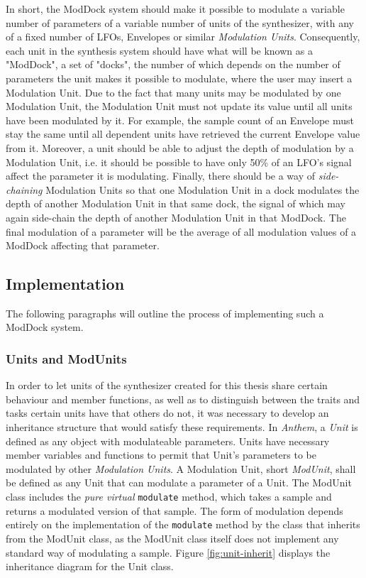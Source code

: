 \documentclass[12pt,twoside]{report}
\begin{document}
In short, the ModDock system should make it possible to modulate a variable number of parameters of a variable number of units of the synthesizer, with any of a fixed number of LFOs, Envelopes or similar \emph{Modulation Units}. Consequently, each unit in the synthesis system should have what will be known as a "ModDock", a set of "docks", the number of which depends on the number of parameters the unit makes it possible to modulate, where the user may insert a Modulation Unit. Due to the fact that many units may be modulated by one Modulation Unit, the Modulation Unit must not update its value until all units have been modulated by it. For example, the sample count of an Envelope must stay the same until all dependent units have retrieved the current Envelope value from it. Moreover, a unit should be able to adjust the depth of modulation by a Modulation Unit, i.e. it should be possible to have only 50\% of an LFO's signal affect the parameter it is modulating. Finally, there should be a way of \emph{side-chaining} Modulation Units so that one Modulation Unit in a dock modulates the depth of another Modulation Unit in that same dock, the signal of which may again side-chain the depth of another Modulation Unit in that ModDock. The final modulation of a parameter will be the average of all modulation values of a ModDock affecting that parameter.

\subsection{Implementation}

The following paragraphs will outline the process of implementing such a ModDock system.

\subsubsection{Units and ModUnits}

In order to let units of the synthesizer created for this thesis share certain behaviour and member functions, as well as to distinguish between the traits and tasks certain units have that others do not, it was necessary to develop an inheritance structure that would satisfy these requirements. In \emph{Anthem}, a \emph{Unit} is defined as any object with modulateable parameters. Units have necessary member variables and functions to permit that Unit's parameters to be modulated by other \emph{Modulation Units}. A Modulation Unit, short \emph{ModUnit}, shall be defined as any Unit that can modulate a parameter of a Unit. The ModUnit class includes the \emph{pure virtual}\footnotemark{} \texttt{modulate} method, which takes a sample and returns a modulated version of that sample. The form of modulation depends entirely on the implementation of the \texttt{modulate} method by the class that inherits from the ModUnit class, as the ModUnit class itself does not implement any standard way of modulating a sample. Figure \ref{fig:unit-inherit} displays the inheritance diagram for the Unit class.
\end{document}
